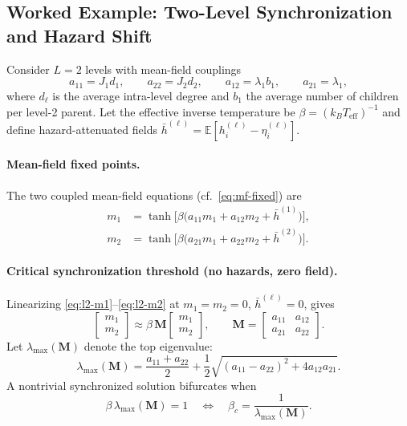 \documentclass[a4paper,11pt]{article}
\begin{document}
\subsection{Worked Example: Two-Level Synchronization and Hazard Shift}
\label{sec:L2-worked}

Consider $L{=}2$ levels with mean-field couplings
\[
a_{11}=J_1 d_1,\qquad
a_{22}=J_2 d_2,\qquad
a_{12}=\lambda_1 b_1,\qquad
a_{21}=\lambda_1,
\]
where $d_\ell$ is the average intra-level degree and $b_1$ the average number of children per level-2 parent. Let the effective inverse temperature be $\beta{=}(k_B T_{\mathrm{eff}})^{-1}$ and define hazard-attenuated fields $\bar h^{(\ell)}=\mathbb{E}[h_i^{(\ell)}-\eta_i^{(\ell)}]$.

\paragraph{Mean-field fixed points.}
The two coupled mean-field equations (cf.\ \eqref{eq:mf-fixed}) are
\begin{align}
m_1 &= \tanh\!\Big[\beta\big(a_{11} m_1 + a_{12} m_2 + \bar h^{(1)}\big)\Big], \label{eq:l2-m1}\\
m_2 &= \tanh\!\Big[\beta\big(a_{21} m_1 + a_{22} m_2 + \bar h^{(2)}\big)\Big]. \label{eq:l2-m2}
\end{align}

\paragraph{Critical synchronization threshold (no hazards, zero field).}
Linearizing \eqref{eq:l2-m1}–\eqref{eq:l2-m2} at $m_1{=}m_2{=}0$, $\bar h^{(\ell)}{=}0$, gives
\[
\begin{bmatrix} m_1 \\[2pt] m_2 \end{bmatrix}
\approx
\beta\,\mathbf{M}
\begin{bmatrix} m_1 \\[2pt] m_2 \end{bmatrix},
\qquad
\mathbf{M}=\begin{bmatrix} a_{11} & a_{12} \\ a_{21} & a_{22} \end{bmatrix}.
\]
Let $\lambda_{\max}(\mathbf{M})$ denote the top eigenvalue:
\[
\lambda_{\max}(\mathbf{M})=\frac{a_{11}+a_{22}}{2}+\frac{1}{2}\sqrt{(a_{11}-a_{22})^2+4 a_{12}a_{21}}.
\]
A nontrivial synchronized solution bifurcates when
\begin{equation}
\label{eq:l2-critical}
\beta\,\lambda_{\max}(\mathbf{M})=1
\quad\Longleftrightarrow\quad
\beta_c=\frac{1}{\lambda_{\max}(\mathbf{M})}.
\end{equation}
\end{document}
